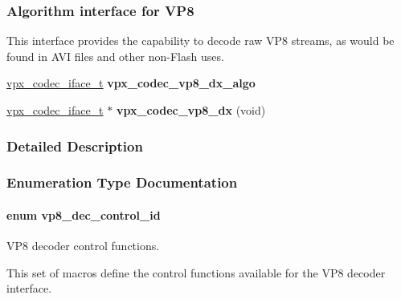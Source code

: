 \subsubsection*{Algorithm interface for V\-P8}
\label{_amgrp0b829b38ff2e659173b35cd78e0735bd}%
This interface provides the capability to decode raw V\-P8 streams, as would be found in A\-V\-I files and other non-\/\-Flash uses. \begin{DoxyCompactItemize}
\item 
\hypertarget{group__vp8__decoder_ga1e151f9094620511e7aa49c04bf8b79e}{\hyperlink{group__codec_gad654f3da60151f5dfef70aca00ef1e9e}{vpx\-\_\-codec\-\_\-iface\-\_\-t} {\bfseries vpx\-\_\-codec\-\_\-vp8\-\_\-dx\-\_\-algo}}\label{group__vp8__decoder_ga1e151f9094620511e7aa49c04bf8b79e}

\item 
\hypertarget{group__vp8__decoder_ga105d15fdb6baef8a2f02d6d5283847fb}{\hyperlink{group__codec_gad654f3da60151f5dfef70aca00ef1e9e}{vpx\-\_\-codec\-\_\-iface\-\_\-t} $\ast$ {\bfseries vpx\-\_\-codec\-\_\-vp8\-\_\-dx} (void)}\label{group__vp8__decoder_ga105d15fdb6baef8a2f02d6d5283847fb}

\end{DoxyCompactItemize}


\subsubsection{Detailed Description}


\subsubsection{Enumeration Type Documentation}
\hypertarget{group__vp8__decoder_gaf9dd3f2e6d1412106ee791af768e57c1}{
\paragraph[{vp8\-\_\-dec\-\_\-control\-\_\-id}]{\setlength{\rightskip}{0pt plus 5cm}enum {\bf vp8\-\_\-dec\-\_\-control\-\_\-id}}}\label{group__vp8__decoder_gaf9dd3f2e6d1412106ee791af768e57c1}


V\-P8 decoder control functions. 

This set of macros define the control functions available for the V\-P8 decoder interface.

